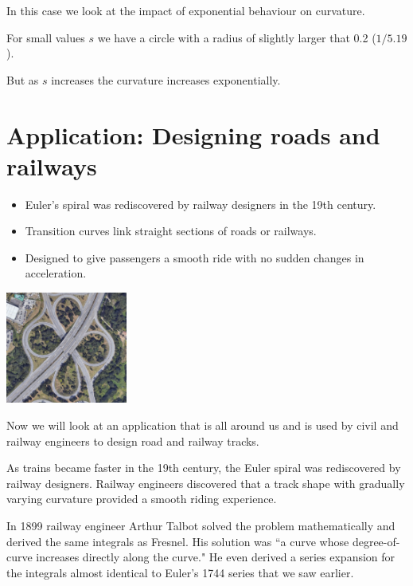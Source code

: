 \documentclass[12pt]{article} %
\theoremstyle{definition}
\theoremstyle{theorem}
\begin{document}
In this case we look at the impact of exponential behaviour on curvature. 

For small values $s$ we have a circle with a radius of slightly larger that 0.2 ($1/5.19$).

But as $s$ increases the curvature increases exponentially.

\section{Application: Designing roads and railways}
\begin{tcolorbox}
	\begin{itemize}
		\item Euler's spiral was rediscovered by railway designers in the 19th century.
		\item Transition curves link straight sections of roads or railways.
		\item Designed to give passengers a smooth ride with no sudden changes in acceleration.
	\end{itemize}
	\begin{minipage}{\linewidth}
		\centering
		\includegraphics[width=40mm, scale=0.5]{cloverleaf_motorway.png}
	\end{minipage}
\end{tcolorbox}

Now we will look at an application that is all around us and is used by civil and railway engineers to design road and railway tracks.
 
As trains became faster in the 19th century, the Euler spiral was rediscovered by railway designers. Railway engineers discovered that a track shape with gradually varying curvature provided a smooth riding experience.

In 1899 railway engineer Arthur Talbot solved the problem mathematically and derived the same integrals as Fresnel. His solution was ``a curve whose degree-of-curve increases directly along the curve." He even derived a series expansion for the integrals almost identical to Euler's 1744 series that we saw earlier.
\end{document}
